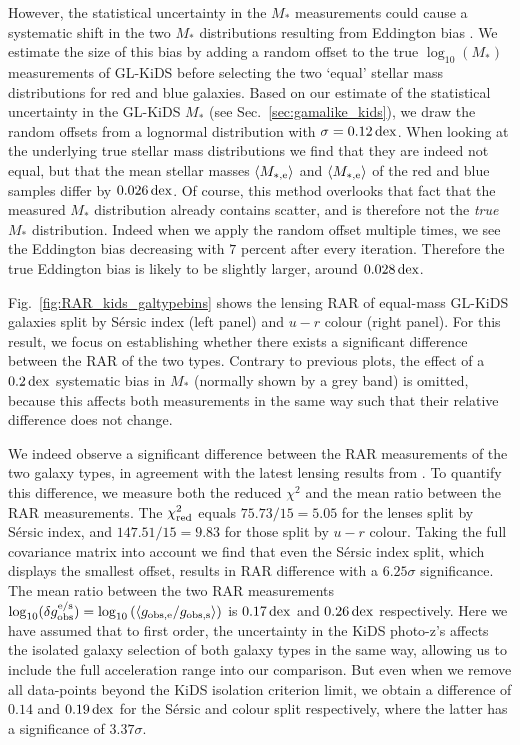 \documentclass[usenatbib]{mnras}
\newcommand{\lan}{\langle}
\newcommand{\ran}{\rangle}
\newcommand{\un}[1]{_{\rm #1}}
\newcommand{\dex}{\, {\rm dex}}
\begin{document}
However, the statistical uncertainty in the $M_*$ measurements could cause a systematic shift in the two $M_*$ distributions resulting from Eddington bias \cite[]{eddington1913}. We estimate the size of this bias by adding a random offset to the true $\log_{10}(M_*)$ measurements of GL-KiDS before selecting the two `equal' stellar mass distributions for red and blue galaxies. Based on our estimate of the statistical uncertainty in the GL-KiDS $M_*$ (see Sec.~\ref{sec:gamalike_kids}), we draw the random offsets from a lognormal distribution with $\sigma = 0.12 \dex$. When looking at the underlying true stellar mass distributions we find that they are indeed not equal, but that the mean stellar masses $\lan M\un{*,e} \ran$ and $\lan M\un{*,e} \ran$ of the red and blue samples differ by $0.026 \dex$. Of course, this method overlooks that fact that the measured $M_*$ distribution already contains scatter, and is therefore not the \emph{true} $M_*$ distribution. Indeed when we apply the random offset multiple times, we see the Eddington bias decreasing with $7$ percent after every iteration. Therefore the true Eddington bias is likely to be slightly larger, around $0.028 \dex$.

Fig.~\ref{fig:RAR_kids_galtypebins} shows the lensing RAR of equal-mass GL-KiDS galaxies split by S\'ersic index (left panel) and $u-r$ colour (right panel). For this result, we focus on establishing whether there exists a significant difference between the RAR of the two types. Contrary to previous plots, the effect of a $0.2 \dex$ systematic bias in $M_*$ (normally shown by a grey band) is omitted, because this affects both measurements in the same way such that their relative difference does not change.

We indeed observe a significant difference between the RAR measurements of the two galaxy types, in agreement with the latest lensing results from \cite{taylor2020}. To quantify this difference, we measure both the reduced $\chi^2$ and the mean ratio between the RAR measurements. The $\chi\un{red}^2$ equals $75.73 / 15 = 5.05$ for the lenses split by S\'ersic index, and $147.51 / 15 = 9.83$ for those split by $u-r$ colour. Taking the full covariance matrix into account we find that even the S\'ersic index split, which displays the smallest offset, results in RAR difference with a $6.25 \sigma$ significance. The mean ratio between the two RAR measurements $\log_{10}(\delta g\un{obs}^{\rm e/s}) = \log_{10}\left( \langle g\un{obs,e} / g\un{obs,s}\rangle \right)$ is $0.17 \dex$ and $0.26 \dex$ respectively. Here we have assumed that to first order, the uncertainty in the KiDS photo-z's affects the isolated galaxy selection of both galaxy types in the same way, allowing us to include the full acceleration range into our comparison. But even when we remove all data-points beyond the KiDS isolation criterion limit, we obtain a difference of $0.14$ and $0.19 \dex$ for the S\'ersic and colour split respectively, where the latter has a significance of $3.37 \sigma$.
\end{document}
